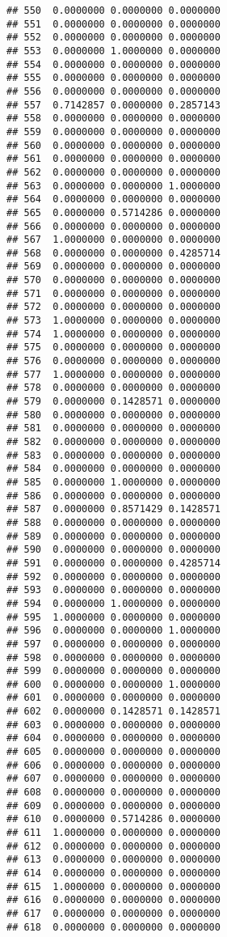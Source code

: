 \documentclass[
]{article}
\begin{document}
\begin{verbatim}
## 550  0.0000000 0.0000000 0.0000000
## 551  0.0000000 0.0000000 0.0000000
## 552  0.0000000 0.0000000 0.0000000
## 553  0.0000000 1.0000000 0.0000000
## 554  0.0000000 0.0000000 0.0000000
## 555  0.0000000 0.0000000 0.0000000
## 556  0.0000000 0.0000000 0.0000000
## 557  0.7142857 0.0000000 0.2857143
## 558  0.0000000 0.0000000 0.0000000
## 559  0.0000000 0.0000000 0.0000000
## 560  0.0000000 0.0000000 0.0000000
## 561  0.0000000 0.0000000 0.0000000
## 562  0.0000000 0.0000000 0.0000000
## 563  0.0000000 0.0000000 1.0000000
## 564  0.0000000 0.0000000 0.0000000
## 565  0.0000000 0.5714286 0.0000000
## 566  0.0000000 0.0000000 0.0000000
## 567  1.0000000 0.0000000 0.0000000
## 568  0.0000000 0.0000000 0.4285714
## 569  0.0000000 0.0000000 0.0000000
## 570  0.0000000 0.0000000 0.0000000
## 571  0.0000000 0.0000000 0.0000000
## 572  0.0000000 0.0000000 0.0000000
## 573  1.0000000 0.0000000 0.0000000
## 574  1.0000000 0.0000000 0.0000000
## 575  0.0000000 0.0000000 0.0000000
## 576  0.0000000 0.0000000 0.0000000
## 577  1.0000000 0.0000000 0.0000000
## 578  0.0000000 0.0000000 0.0000000
## 579  0.0000000 0.1428571 0.0000000
## 580  0.0000000 0.0000000 0.0000000
## 581  0.0000000 0.0000000 0.0000000
## 582  0.0000000 0.0000000 0.0000000
## 583  0.0000000 0.0000000 0.0000000
## 584  0.0000000 0.0000000 0.0000000
## 585  0.0000000 1.0000000 0.0000000
## 586  0.0000000 0.0000000 0.0000000
## 587  0.0000000 0.8571429 0.1428571
## 588  0.0000000 0.0000000 0.0000000
## 589  0.0000000 0.0000000 0.0000000
## 590  0.0000000 0.0000000 0.0000000
## 591  0.0000000 0.0000000 0.4285714
## 592  0.0000000 0.0000000 0.0000000
## 593  0.0000000 0.0000000 0.0000000
## 594  0.0000000 1.0000000 0.0000000
## 595  1.0000000 0.0000000 0.0000000
## 596  0.0000000 0.0000000 1.0000000
## 597  0.0000000 0.0000000 0.0000000
## 598  0.0000000 0.0000000 0.0000000
## 599  0.0000000 0.0000000 0.0000000
## 600  0.0000000 0.0000000 1.0000000
## 601  0.0000000 0.0000000 0.0000000
## 602  0.0000000 0.1428571 0.1428571
## 603  0.0000000 0.0000000 0.0000000
## 604  0.0000000 0.0000000 0.0000000
## 605  0.0000000 0.0000000 0.0000000
## 606  0.0000000 0.0000000 0.0000000
## 607  0.0000000 0.0000000 0.0000000
## 608  0.0000000 0.0000000 0.0000000
## 609  0.0000000 0.0000000 0.0000000
## 610  0.0000000 0.5714286 0.0000000
## 611  1.0000000 0.0000000 0.0000000
## 612  0.0000000 0.0000000 0.0000000
## 613  0.0000000 0.0000000 0.0000000
## 614  0.0000000 0.0000000 0.0000000
## 615  1.0000000 0.0000000 0.0000000
## 616  0.0000000 0.0000000 0.0000000
## 617  0.0000000 0.0000000 0.0000000
## 618  0.0000000 0.0000000 0.0000000

\end{verbatim}
\end{document}
